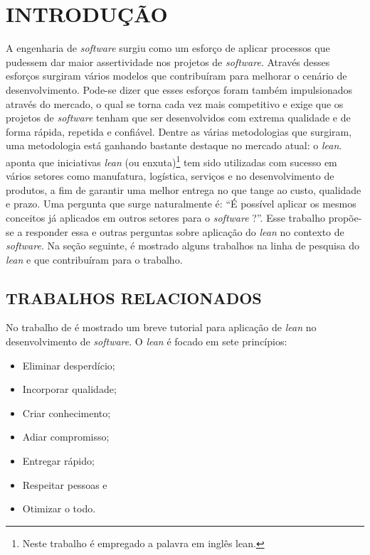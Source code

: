 \setcounter{page}{1}
\chapter{INTRODU\c{C}\~AO}  %
\label{chap:01}
A engenharia de \textit{software} surgiu como um esforço de aplicar processos que pudessem dar maior assertividade nos projetos de \textit{software}. Através desses esforços surgiram vários modelos que contribuíram para melhorar o cenário de desenvolvimento. Pode-se dizer que esses esforços foram também impulsionados através do mercado, o qual se torna cada vez mais competitivo e exige que os projetos de \textit{software} tenham que ser desenvolvidos com extrema qualidade e de forma rápida, repetida e confiável.
Dentre as várias metodologias que surgiram, uma metodologia está ganhando bastante destaque no mercado atual: o \textit{lean}.  aponta que iniciativas \textit{lean} (ou enxuta)\footnote{Neste trabalho é empregado a palavra em inglês lean.}  tem sido utilizadas com sucesso em vários setores como manufatura, logística, serviços e no desenvolvimento de produtos, a fim de garantir uma melhor entrega no que tange ao custo, qualidade e prazo. Uma pergunta que surge naturalmente é: “É possível aplicar os mesmos conceitos já aplicados em outros setores para o \textit{software} ?”. Esse trabalho propõe-se a responder essa e outras perguntas sobre aplicação do \textit{lean} no contexto de \textit{software}. 
Na seção seguinte, é mostrado alguns trabalhos na linha de pesquisa do \textit{lean} e que contribuíram para o trabalho.

\section{TRABALHOS RELACIONADOS}

No trabalho  de  é mostrado um breve tutorial para aplicação de \textit{lean} no desenvolvimento de \textit{software}. O \textit{lean} é focado em sete princípios:

\begin{itemize}
	\item Eliminar desperdício;
	\item Incorporar qualidade;
	\item	Criar conhecimento;
	\item	Adiar compromisso;
	\item	Entregar rápido;
	\item	Respeitar pessoas e
	\item	Otimizar o todo.
\end{itemize}


